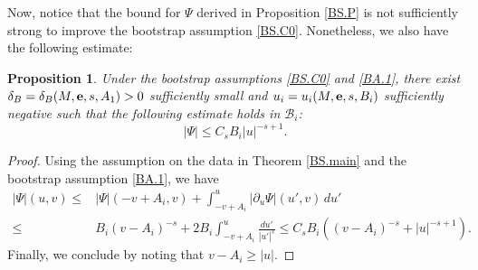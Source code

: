 \documentclass[10pt, reqno]{amsart}
\newtheorem{proposition}[theorem]{Proposition}
\theoremstyle{definition}
\theoremstyle{remark}
\numberwithin{equation}{section}
\newcommand{\rd}{\partial}
\newcommand{\0}{\emptyset}
\newcommand{\f}{\frac}
\newcommand{\de}{\delta}
\begin{document}
Now, notice that the bound for $\Psi$ derived in Proposition \ref{BS.P} is not sufficiently strong to improve the bootstrap assumption \eqref{BS.C0}. Nonetheless, we also have the following estimate:
\begin{proposition}\label{Psi.C0}
Under the bootstrap assumptions \eqref{BS.C0} and \eqref{BA.1}, there exist $\de_B=\de_B(M,{\bf e},s,A_1)>0$ sufficiently small and $u_i=u_i(M,{\bf e},s,B_i)$ sufficiently negative such that the following estimate holds in $\mathcal B_i$:
$$|\Psi|\leq C_sB_i|u|^{-s+1}.$$
\end{proposition}
\begin{proof}
Using the assumption on the data in Theorem \ref{BS.main} and the bootstrap assumption \eqref{BA.1}, we have
\begin{equation*}
\begin{split}
|\Psi|(u,v)\leq &|\Psi|(-v+A_i, v)+\int_{-v+A_i}^u|\rd_u\Psi|(u',v)\,du'\\
\leq &B_i(v-A_i)^{-s}+2B_i\int_{-v+A_i}^u\f{du'}{|u'|^s}\leq C_sB_i\left((v-A_i)^{-s}+|u|^{-s+1}\right).
\end{split}
\end{equation*}
Finally, we conclude by noting that $v-A_i\geq |u|$.
\end{proof}
\end{document}
